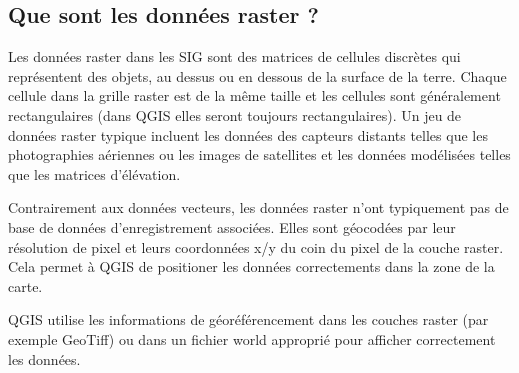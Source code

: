 \subsection{Que sont les donn\'ees raster ?}\label{label_whatsraster}

Les donn\'ees raster dans les SIG sont des matrices de cellules discr\`etes qui
repr\'esentent des objets, au dessus ou en dessous de la surface de la terre.
Chaque cellule dans la grille raster est de la m\^eme taille et les cellules sont
g\'en\'eralement rectangulaires (dans QGIS elles seront toujours rectangulaires).
Un jeu de donn\'ees raster typique incluent les donn\'ees des capteurs distants
telles que les photographies a\'eriennes ou les images de satellites et les
donn\'ees mod\'elis\'ees telles que les matrices d'\'el\'evation.

Contrairement aux donn\'ees vecteurs, les donn\'ees raster n'ont typiquement pas de
base de donn\'ees d'enregistrement associ\'ees. Elles sont g\'eocod\'ees par leur
r\'esolution de pixel et leurs coordonn\'ees x/y du coin du pixel de la couche
raster. Cela permet \`a QGIS de positioner les donn\'ees correctements dans la zone
de la carte.

QGIS utilise les informations de g\'eor\'ef\'erencement dans les couches raster (par
exemple GeoTiff) ou dans un fichier world appropri\'e pour afficher correctement
les donn\'ees.


